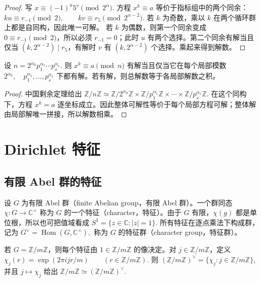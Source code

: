 \documentclass[oneside]{AJbook}
\newcommand{\Z}{\mathbb Z}
\newcommand{\C}{\mathbb C}
\newcommand{\Cyc}[1]{\Z/#1\Z}
\newcommand{\expi}[1]{\exp(2\pi i #1)}
\DeclareMathOperator{\Hom}{Hom}
\begin{document}
\begin{proof}
写
\(
  x\equiv (-1)^u5^v\pmod {2^\alpha}.
\)
方程 $x^k\equiv a$ 等价于指标组中的两个同余：
\(
  ku\equiv r_{-1}\pmod 2,\qquad
  kv\equiv r_5\pmod {2^{\alpha-2}}.
\)
若 $k$ 为奇数，乘以 $k$ 在两个循环群上都是自同构，因此唯一可解。
若 $k$ 为偶数，则第一个同余变成 $0\equiv r_{-1}\pmod2$，所以必须 $r_{-1}=0$；此时 $u$ 有两个选择。第二个同余有解当且仅当
$(k,2^{\alpha-2})\mid r_5$，有解时 $v$ 有 $(k,2^{\alpha-2})$ 个选择。乘起来得到解数。
\end{proof}

\begin{theorem}[一般模数的二项同余]
设
\(
  n=2^{\alpha_0}p_1^{\alpha_1}\cdots p_s^{\alpha_s}.
\)
则
\(
  x^k\equiv a\pmod n
\)
有解当且仅当它在每个局部模数
\(
  2^{\alpha_0},\quad p_1^{\alpha_1},\ldots,p_s^{\alpha_s}
\)
下都有解。若有解，则总解数等于各局部解数之积。
\end{theorem}

\begin{proof}
中国剩余定理给出
\(
  \Z/n\Z\simeq
  \Z/2^{\alpha_0}\Z\times
  \Z/p_1^{\alpha_1}\Z\times\cdots\times
  \Z/p_s^{\alpha_s}\Z.
\)
在这个同构下，方程 $x^k=a$ 逐坐标成立。因此整体可解性等价于每个局部方程可解；整体解由局部解唯一拼接，所以解数相乘。
\end{proof}

\chapter{Dirichlet 特征}

\section{有限 Abel 群的特征}

\begin{definition}
设 $G$ 为有限 Abel 群（finite Abelian group，有限 Abel 群）。一个群同态
\(
  \chi:G\longrightarrow \C^\times
\)
称为 $G$ 的一个特征（character，特征）。由于 $G$ 有限，$\chi(g)$ 都是单位根，所以也可把值域看成
\(
  S^1=\{z\in\C:|z|=1\}.
\)
所有特征在逐点乘法下构成群，记为
\(
  G^\vee=\Hom(G,\C^\times),
\)
称为 $G$ 的特征群（character group，特征群）。
\end{definition}

\begin{example}
若 $G=\Cyc m$，则每个特征由 $1\in\Cyc m$ 的像决定。对
$j\in\Z/m\Z$，定义
\(
  \chi_j(r)=\expi{jr/m}\qquad(r\in\Z/m\Z).
\)
则
\(
  (\Cyc m)^\vee=\{\chi_j:j\in\Z/m\Z\},
\)
并且 $j\mapsto \chi_j$ 给出
\(
  \Cyc m\simeq (\Cyc m)^\vee.
\)
\end{example}
\end{document}
